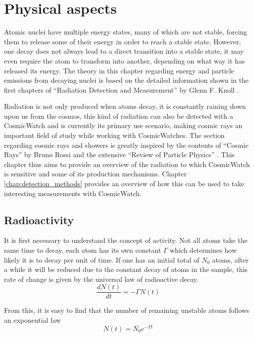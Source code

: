 \chapter{Physical aspects}

Atomic nuclei have multiple energy states, many of which are not stable, forcing them to release some of their energy in order to reach a stable state. However, one decay does not always lead to a direct transition into a stable state, it may even require the atom to transform into another, depending on what way it has released its energy. The theory in this chapter regarding energy and particle emissions from decaying nuclei is based on the detailed information shown in the first chapters of ``Radiation Detection and Measurement'' by Glenn F. Knoll \cite{knoll2010radiation}. 

Radiation is not only produced when atoms decay, it is constantly raining down upon us from the cosmos, this kind of radiation can also be detected with a CosmicWatch and is currently its primary use scenario, making cosmic rays an important field of study while working with CosmicWatches. The section regarding cosmic rays and showers is greatly inspired by the contents of ``Cosmic Rays'' by Bruno Rossi \cite{brunoRossi} and the extensive ``Review of Particle Physics'' \cite{ReviewOfParticlePhysics}. This chapter thus aims to provide an overview of the radiation to which CosmicWatch is sensitive and some of its production mechanisms. Chapter \ref{chap:detection_methods} provides an overview of how this can be used to take interesting measurements with CosmicWatch.

\section{Radioactivity}

It is first necessary to understand the concept of activity. Not all atoms take the same time to decay, each atom has its own constant $\Gamma$ which determines how likely it is to decay per unit of time. If one has an initial total of $N_0$ atoms, after a while it will be reduced due to the constant decay of atoms in the sample, this rate of change is given by the universal law of radioactive decay.
\begin{equation}
    \frac{dN(t)}{dt} = -\Gamma N(t)
\end{equation}

From this, it is easy to find that the number of remaining unstable atoms follows an exponential law
\begin{equation}
    N(t) = N_0 e^{-\Gamma t}
\end{equation}

